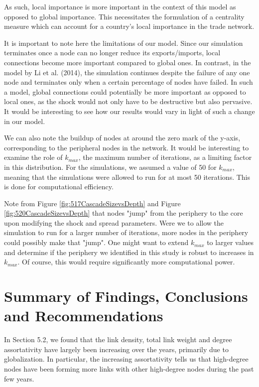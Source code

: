 \documentclass[12pt,letterpaper]{report}
\begin{document}
	As such, local importance is more important in the context of this model as opposed to global importance. This necessitates the formulation of a centrality measure which can account for a country's local importance in the trade network. 

	It is important to note here the limitations of our model. Since our simulation terminates once a node can no longer reduce its exports/imports, local connections become more important compared to global ones. In contrast, in the model by Li et al. (2014), the simulation continues despite the failure of any one node and terminates only when a certain percentage of nodes have failed. In such a model, global connections could potentially be more important as opposed to local ones, as the shock would not only have to be destructive but also pervasive. It would be interesting to see how our results would vary in light of such a change in our model.

	We can also note the buildup of nodes at around the zero mark of the y-axis, corresponding to the peripheral nodes in the network. It would be interesting to examine the role of $k_{max}$, the maximum number of iterations, as a limiting factor in this distribution. For the simulations, we assumed a value of 50 for $k_{max}$, meaning that the simulations were allowed to run for at most 50 iterations. This is done for computational efficiency. 
	
	Note from Figure \ref{fig:517CascadeSizevsDepth} and Figure \ref{fig:520CascadeSizevsDepth} that nodes "jump" from the periphery to the core upon modifying the shock and spread parameters. Were we to allow the simulation to run for a larger number of iterations, more nodes in the periphery could possibly make that "jump". One might want to extend $k_{max}$ to larger values and determine if the periphery we identified in this study is robust to increases in $k_{max}$. Of course, this would require significantly more computational power.

\chapter{Summary of Findings, Conclusions and Recommendations}
\label{chap:6Conclusion}

In Section 5.2, we found that the link density, total link weight and degree assortativity have largely been increasing over the years, primarily due to globalization. In particular, the increasing assortativity tells us that high-degree nodes have been forming more links with other high-degree nodes during the past few years. 
\end{document}
